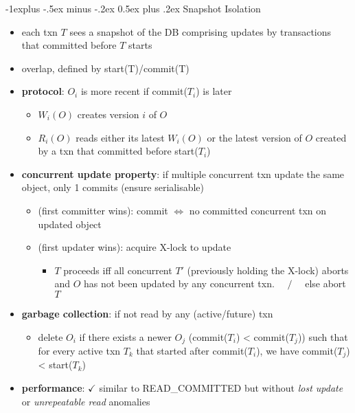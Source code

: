 \documentclass[10pt, landscape]{article}
\makeatletter
\renewcommand{\subsection}{\@startsection{subsection}{2}{0mm}%
  {-1explus -.5ex minus -.2ex}%
  {0.5ex plus .2ex}%
{\normalfont\normalsize\bfseries}}
\makeatother
\begin{document}
\begin{multicols*}{4}
  \subsection{Snapshot Isolation}

  \begin{itemize}
    \item each txn $T$ sees a snapshot of the DB comprising updates by transactions that committed before $T$ starts
    \item {} overlap, defined by start(T)/commit(T)
    \item \textbf{protocol}: $O_i$ is more recent if commit($T_i$) is later
          \begin{itemize}
            \item $W_i(O)$ creates version $i$ of $O$
            \item $R_i(O)$ reads either its latest $W_i(O)$ or the latest version of $O$ created by a txn that committed before start($T_i$)
          \end{itemize}
    \item \textbf{concurrent update property}: if multiple concurrent txn update the same object, only 1 commits (ensure serialisable)
          \begin{itemize}
            \item {} (first committer wins): commit $\iff$ no committed concurrent txn on updated object
            \item {} (first updater wins): acquire X-lock to update
                  \begin{itemize}
                    \item $T$ proceeds iff all concurrent $T'$ (previously holding the X-lock) aborts and $O$ has not been updated by any concurrent txn. $\quad/\quad$ else abort $T$
                  \end{itemize}
          \end{itemize}
    \item \textbf{garbage collection}: if not read by any (active/future) txn
          \begin{itemize}
            \item delete $O_i$ if there exists a newer $O_j$ (commit($T_i$) < commit($T_j$)) such that for every active txn $T_k$ that started after commit($T_i$),  we have commit($T_j$) < start($T_k$)
          \end{itemize}
    \item \textbf{performance}: $\checkmark$ similar to READ\_COMMITTED but without \textit{lost update} or \textit{unrepeatable read} anomalies

\end{itemize}
\end{multicols*}
\end{document}
